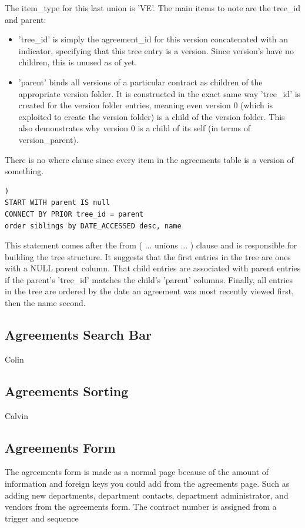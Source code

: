 \documentclass{report}
\begin{document}
The item\_type for this last union is 'VE'.  The main items to note are the tree\_id and parent:
\begin{itemize}
	\item 'tree\_id' is simply the agreement\_id for this version concatenated with an indicator, specifying that this tree entry is a version.  Since version's have no children, this is unused as of yet.
	\item 'parent' binds all versions of a particular contract as children of the appropriate version folder.  It is constructed in the exact same way 'tree\_id' is created for the version folder entries, meaning even version 0 (which is exploited to create the version folder) is a child of the version folder.  This also demonstrates why version 0 is a child of its self (in terms of version\_parent).
\end{itemize}
There is no where clause since every item in the agreements table is a version of something.
\begin{lstlisting}[caption=final pieces of the initial select statement creating the tree structure.]
)
START WITH parent IS null
CONNECT BY PRIOR tree_id = parent
order siblings by DATE_ACCESSED desc, name
\end{lstlisting}
This statement comes after the from ( ... unions ... ) clause and is responsible for building the tree structure.  It suggests that the first entries in the tree are ones with a NULL parent column.  That child entries are associated with parent entries if the parent's 'tree\_id' matches the child's 'parent' columns.  Finally, all entries in the tree are ordered by the date an agreement was most recently viewed first, then the name second.
\subsection{Agreements Search Bar}
Colin 

\subsection{Agreements Sorting}
Calvin

\subsection{Agreements Form}
The agreements form is made as a normal page because of the amount of information and foreign keys you could add from the agreements page. Such as adding new departments, department contacts, department administrator, and vendors from the agreements form. The contract number is assigned from a trigger and sequence
\end{document}
